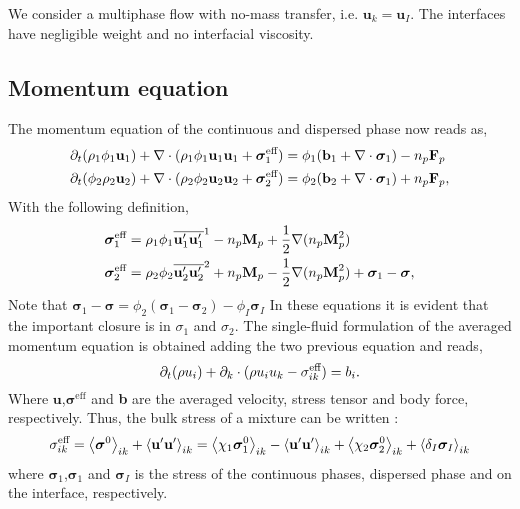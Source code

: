 
We consider a multiphase flow with no-mass transfer, i.e. $\textbf{u}_k=\textbf{u}_I$.
The interfaces have negligible weight and no interfacial viscosity. 

\subsection{Momentum equation}
The momentum equation of the continuous and dispersed phase now reads as, 
\begin{align*}
    \partial_t (\rho_1\phi_1 \textbf{u}_1 )
    + \mathbf{\nabla} \cdot (\rho_1\phi_1 \textbf{u}_1  \textbf{u}_1
    + \bm{\sigma}^\text{eff}_1 )
    &= 
    \phi_1( \textbf{b}_1  +\mathbf{\nabla} \cdot  \bm{\sigma}_1)
    - n_p\textbf{F}_p \\
    \partial_t (\phi_2  \rho_2\textbf{u}_2)
    + \mathbf{\nabla} \cdot (
        \rho_2\phi_2 \textbf{u}_2\textbf{u}_2
        + \bm{\sigma}^\text{eff}_2
        )
    &= 
     \phi_2 (
      \textbf{b}_2
    + \mathbf{\nabla} \cdot \bm{\sigma}_1 )
    + n_p\textbf{F}_p ,
\end{align*}
With the following definition, 
\begin{align*}
    \bm{\sigma}^\text{eff}_1
    &=\rho_1 \phi_1 \overline{\textbf{u}_1'\textbf{u}_1'}^1
    - n_p\textbf{M}_p 
    + \frac{1}{2}\mathbf{\nabla} (n_p \textbf{M}_p^2)
    \\
    \bm{\sigma}^\text{eff}_2
    &= \rho_2\phi_2 \overline{ \textbf{u}_2'\textbf{u}_2'}^2 
    + n_p\textbf{M}_p 
    - \frac{1}{2}\mathbf{\nabla} (n_p \textbf{M}_p^2)
    +\bm{\sigma}_1 - \bm{\sigma},
\end{align*}
Note that  $\bm{\sigma}_1 - \bm{\sigma} =  \phi_2 (\bm{\sigma}_1  - \bm{\sigma}_2) - \phi_I \bm{\sigma}_I$
In these equations it is evident that the important closure is in $\sigma_1$ and $\sigma_2$.
The single-fluid formulation of the averaged momentum equation is obtained adding the two previous equation and reads,
\begin{equation}
    \partial_t (\rho u_i)
    + \partial_k \cdot (\rho u_i u_k - \sigma_{ik}^\text{eff})
    = b_i. 
    \label{eq:dt_rho_u}
\end{equation}
Where $\textbf{u}$,$\bm{\sigma}^\text{eff}$ and \textbf{b} are the averaged velocity, stress tensor and body force, respectively. 
Thus, the bulk stress of a mixture can be written : 
\begin{equation}
    \sigma_{ik}^\text{eff}
    = \left<\bm{\sigma}^0\right>_{ik}
    + \left<\textbf{u}'\textbf{u}'\right>_{ik}
    = \left<\chi_1 \bm{\sigma}^0_1\right>_{ik} 
    - \left<\textbf{u}'\textbf{u}'\right>_{ik}
    +\left<\chi_2 \bm{\sigma}^0_2\right>_{ik}
    + \left<\delta_I \bm{\sigma}_I\right>_{ik}
    \label{eq:sigma}
\end{equation}
where $\bm{\sigma}_1$,$\bm{\sigma}_1$ and $\bm{\sigma}_I$  is the stress of the continuous phases, dispersed phase and on the interface, respectively.

